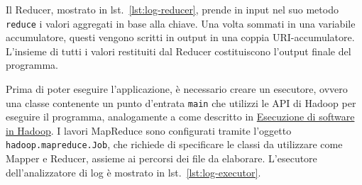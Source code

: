 \documentclass[italian,a4paper, twoside, 12pt]{report}
\begin{document}
Il Reducer, mostrato in lst.~\ref{lst:log-reducer}, prende in input nel
suo metodo \texttt{reduce} i valori aggregati in base alla chiave. Una
volta sommati in una variabile accumulatore, questi vengono scritti in
output in una coppia URI-accumulatore. L'insieme di tutti i valori
restituiti dal Reducer costituiscono l'output finale del programma.

Prima di poter eseguire l'applicazione, è necessario creare un
esecutore, ovvero una classe contenente un punto d'entrata \texttt{main}
che utilizzi le API di Hadoop per eseguire il programma, analogamente a
come descritto in
\protect\hyperlink{esecuzione-di-software-in-hadoop}{Esecuzione di
software in Hadoop}. I lavori MapReduce sono configurati tramite
l'oggetto \texttt{hadoop.mapreduce.Job}, che richiede di specificare le
classi da utilizzare come Mapper e Reducer, assieme ai percorsi dei file
da elaborare. L'esecutore dell'analizzatore di log è mostrato in
lst.~\ref{lst:log-executor}.
\end{document}
